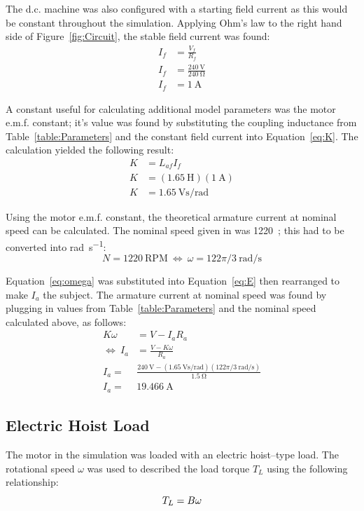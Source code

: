 \documentclass[a4paper,11pt,twocolumn]{article}
\newcommand{\V}{\si{\volt}\xspace}
\newcommand{\A}{\si{\ampere}\xspace}
\newcommand{\Ohm}{\si{\ohm}\xspace}
\renewcommand{\H}{\si{\henry}\xspace}
\newcommand{\rps}{\si{\radian\per\second}\xspace}
\newcommand{\Vspr}{\si{\volt\second\per\radian}\xspace}
\newcommand{\RPM}{\text{RPM}\xspace}
\newcommand{\DC}{d.c.\xspace}
\newcommand{\EMF}{e.m.f.\xspace}
\begin{document}
The \DC machine was also configured with a starting field current as this would 
be constant throughout the simulation. Applying Ohm's law to the right hand 
side of Figure~\ref{fig:Circuit}, the stable field current was found:
\begin{align*}
    I_f &= \frac{V_f}{R_f} \\
    I_f &= \frac{240~\V}{240~\Ohm} \\
    I_f &= 1~\A
\end{align*}

A constant useful for calculating additional model parameters was the motor 
\EMF constant; it's value was found by substituting the coupling inductance 
from Table~\ref{table:Parameters} and the constant field current into 
Equation~\ref{eq:K}. The calculation yielded the following result:
\begin{align*}
    K &= L_{af} I_f \\
    K &= (1.65~\H) (1~\A) \\
    K &= 1.65~\Vspr
\end{align*}

Using the motor \EMF constant, the theoretical armature current at nominal 
speed can be calculated. The nominal speed given in 
\cite{brigham2016coursework} was 1220~\RPM; this had to be converted into \rps:
\begin{equation*}
    N = 1220~\RPM~\Leftrightarrow~\omega = 122\pi/3~\rps
\end{equation*}

Equation~\ref{eq:omega} was substituted into Equation~\ref{eq:E} then 
rearranged to make $I_a$ the subject. The armature current at nominal speed was 
found by plugging in values from Table~\ref{table:Parameters} and the nominal 
speed calculated above, as follows:
\begin{align*}
    K \omega &= V - I_a R_a \\
    \Leftrightarrow~ I_a &= \frac{V - K \omega}{R_a} \\
    I_a =& \frac{240~\V - (1.65~\Vspr)(122\pi/3~\rps)}{1.5~\Ohm} \\
    I_a =& 19.466~\A
\end{align*}

\subsection{Electric Hoist Load}

The motor in the simulation was loaded with an electric hoist--type load. The 
rotational speed $\omega$ was used to described the load torque $T_L$ 
using the following relationship:
\begin{equation} \label{eq:B}
    T_L = B\omega \\
\end{equation}
\end{document}
